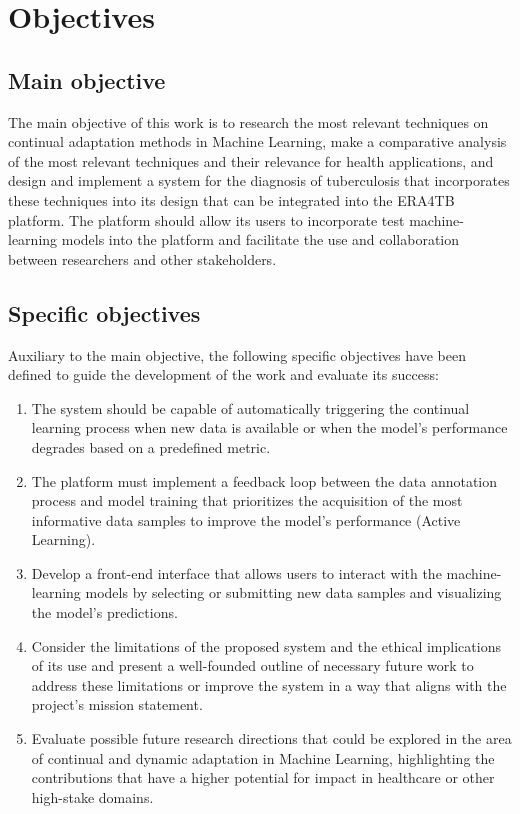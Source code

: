 \documentclass[../main.tex]{subfiles}
\begin{document}

    \clearpage

    \section{Objectives} \label{sec:objectives}

    \subsection*{Main objective} \label{sec:main_goal}

    The main objective of this work is to research the most relevant techniques on continual adaptation methods in Machine Learning, make a comparative analysis of the most relevant techniques and their relevance for health applications, and design and implement a system for the diagnosis of tuberculosis that incorporates these techniques into its design that can be integrated into the ERA4TB platform. The platform should allow its users to incorporate test machine-learning models into the platform and facilitate the use and collaboration between researchers and other stakeholders.

    \subsection*{Specific objectives} \label{sec:specific_objectives}

    Auxiliary to the main objective, the following specific objectives have been defined to guide the development of the work and evaluate its success:

    \begin{enumerate}
        \item The system should be capable of automatically triggering the continual learning process when new data is available or when the model's performance degrades based on a predefined metric.
        \item The platform must implement a feedback loop between the data annotation process and model training that prioritizes the acquisition of the most informative data samples to improve the model's performance (Active Learning).
        \item Develop a front-end interface that allows users to interact with the machine-learning models by selecting or submitting new data samples and visualizing the model's predictions.
        \item Consider the limitations of the proposed system and the ethical implications of its use and present a well-founded outline of necessary future work to address these limitations or improve the system in a way that aligns with the project's mission statement.
        \item Evaluate possible future research directions that could be explored in the area of continual and dynamic adaptation in Machine Learning, highlighting the contributions that have a higher potential for impact in healthcare or other high-stake domains.
    \end{enumerate}
\end{document}
